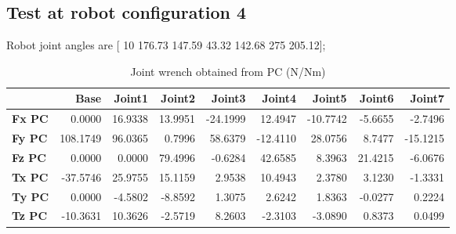 
\subsection{Test at robot configuration 4}
Robot joint angles are  [ 10        176.73        147.59         43.32        142.68           275        205.12];

\begin{table}[h!]
	\centering
	\caption{Joint wrench obtained from PC (N/Nm)}
	\label{wrech_PC_Pose4}
	\begin{tabular}{|l|r|r|r|r|r|r|r|r|}
		\hline
		\textbf{}  & \textbf{Base} & \textbf{Joint1}  & \textbf{Joint2}  & \textbf{Joint3}  & \textbf{Joint4}  & \textbf{Joint5}  & \textbf{Joint6}  & \textbf{Joint7} \\ \hline
		\textbf{Fx PC}  & 0.0000        & 16.9338        & 13.9951        & -24.1999        & 12.4947        & -10.7742        & -5.6655        & -2.7496 \\ \hline
		\textbf{Fy PC}  & 108.1749        & 96.0365        & 0.7996        & 58.6379        & -12.4110        & 28.0756        & 8.7477        & -15.1215 \\ \hline
		\textbf{Fz PC}  & 0.0000        & 0.0000        & 79.4996        & -0.6284        & 42.6585        & 8.3963        & 21.4215        & -6.0676 \\ \hline
		\textbf{Tx PC}  & -37.5746        & 25.9755        & 15.1159        & 2.9538        & 10.4943        & 2.3780        & 3.1230        & -1.3331 \\ \hline
		\textbf{Ty PC}  & 0.0000        & -4.5802        & -8.8592        & 1.3075        & 2.6242        & 1.8363        & -0.0277        & 0.2224 \\ \hline
		\textbf{Tz PC}  & -10.3631        & 10.3626        & -2.5719        & 8.2603        & -2.3103        & -3.0890        & 0.8373        & 0.0499 \\ \hline
	\end{tabular}
\end{table}

